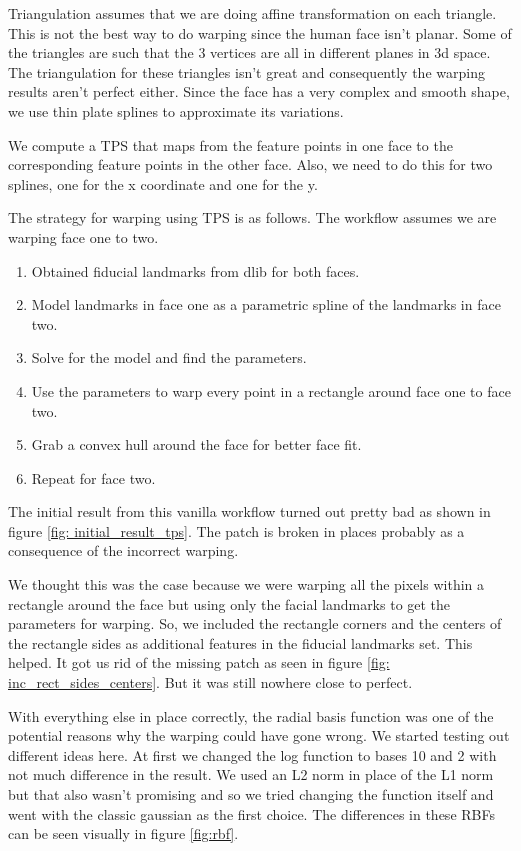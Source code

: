 \documentclass[conference]{IEEEtran}
\begin{document}
Triangulation assumes that we are doing affine transformation on each triangle. This is not the best way to do warping since the human face isn't planar. Some of the triangles are such that the 3 vertices are all in different planes in 3d space. The triangulation for these triangles isn't great and consequently the warping results aren't perfect either. Since the face has a very complex and smooth shape, we use thin plate splines to approximate its variations.

We compute a TPS that maps from the feature points in one face to the corresponding feature points in the other face. Also, we need to do this for two splines, one for the x coordinate and one for the y.

The strategy for warping using TPS is as follows. The workflow assumes we are warping face one to two.
\begin{enumerate}
    \item Obtained fiducial landmarks from dlib for both faces.
    \item Model landmarks in face one as a parametric spline of the landmarks in face two.
    \item Solve for the model and find the parameters.
    \item Use the parameters to warp every point in a rectangle around face one to face two.
    \item Grab a convex hull around the face for better face fit.
    \item Repeat for face two.
\end{enumerate}

The initial result from this vanilla workflow turned out pretty bad as shown in figure \ref{fig: initial_result_tps}. The patch is broken in places probably as a consequence of the incorrect warping.

We thought this was the case because we were warping all the pixels within a rectangle around the face but using only the facial landmarks to get the parameters for warping. So, we included the rectangle corners and the centers of the rectangle sides as additional features in the fiducial landmarks set. This helped. It got us rid of the missing patch as seen in figure \ref{fig: inc_rect_sides_centers}. But it was still nowhere close to perfect.

With everything else in place correctly, the radial basis function was one of the potential reasons why the warping could have gone wrong. We started testing out different ideas here. At first we changed the log function to bases 10 and 2 with not much difference in the result. We used an L2 norm in place of the L1 norm but that also wasn't promising and so we tried changing the function itself and went with the classic gaussian as the first choice. The differences in these RBFs can be seen visually in figure \ref{fig:rbf}. 
\end{document}
